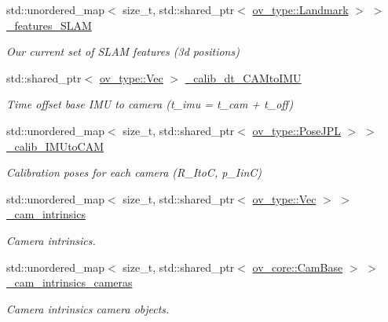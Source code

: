 \begin{DoxyCompactItemize}
\mbox{\label{classov__msckf_1_1State_ac08dc6bd1557fd4c3639d5eb2a998cb4}} 
std\+::unordered\+\_\+map$<$ size\+\_\+t, std\+::shared\+\_\+ptr$<$ \hyperlink{classov__type_1_1Landmark}{ov\+\_\+type\+::\+Landmark} $>$ $>$ \hyperlink{classov__msckf_1_1State_ac08dc6bd1557fd4c3639d5eb2a998cb4}{\+\_\+features\+\_\+\+S\+L\+AM}
\begin{DoxyCompactList}\small\item\em Our current set of S\+L\+AM features (3d positions) \end{DoxyCompactList}\item 
\mbox{\label{classov__msckf_1_1State_a0ef68be4e06e4b4947c86852d1005893}} 
std\+::shared\+\_\+ptr$<$ \hyperlink{classov__type_1_1Vec}{ov\+\_\+type\+::\+Vec} $>$ \hyperlink{classov__msckf_1_1State_a0ef68be4e06e4b4947c86852d1005893}{\+\_\+calib\+\_\+dt\+\_\+\+C\+A\+Mto\+I\+MU}
\begin{DoxyCompactList}\small\item\em Time offset base I\+MU to camera (t\+\_\+imu = t\+\_\+cam + t\+\_\+off) \end{DoxyCompactList}\item 
\mbox{\label{classov__msckf_1_1State_a61797fa8310111f413c5c5b45c19460b}} 
std\+::unordered\+\_\+map$<$ size\+\_\+t, std\+::shared\+\_\+ptr$<$ \hyperlink{classov__type_1_1PoseJPL}{ov\+\_\+type\+::\+Pose\+J\+PL} $>$ $>$ \hyperlink{classov__msckf_1_1State_a61797fa8310111f413c5c5b45c19460b}{\+\_\+calib\+\_\+\+I\+M\+Uto\+C\+AM}
\begin{DoxyCompactList}\small\item\em Calibration poses for each camera (R\+\_\+\+ItoC, p\+\_\+\+IinC) \end{DoxyCompactList}\item 
\mbox{\label{classov__msckf_1_1State_a5323d1f31a15c9b54b6696ffb5db353f}} 
std\+::unordered\+\_\+map$<$ size\+\_\+t, std\+::shared\+\_\+ptr$<$ \hyperlink{classov__type_1_1Vec}{ov\+\_\+type\+::\+Vec} $>$ $>$ \hyperlink{classov__msckf_1_1State_a5323d1f31a15c9b54b6696ffb5db353f}{\+\_\+cam\+\_\+intrinsics}
\begin{DoxyCompactList}\small\item\em Camera intrinsics. \end{DoxyCompactList}\item 
\mbox{\label{classov__msckf_1_1State_af66308da3cab5bcc0098aadd5a16e874}} 
std\+::unordered\+\_\+map$<$ size\+\_\+t, std\+::shared\+\_\+ptr$<$ \hyperlink{classov__core_1_1CamBase}{ov\+\_\+core\+::\+Cam\+Base} $>$ $>$ \hyperlink{classov__msckf_1_1State_af66308da3cab5bcc0098aadd5a16e874}{\+\_\+cam\+\_\+intrinsics\+\_\+cameras}
\begin{DoxyCompactList}\small\item\em Camera intrinsics camera objects. \end{DoxyCompactList}\end{DoxyCompactItemize}
